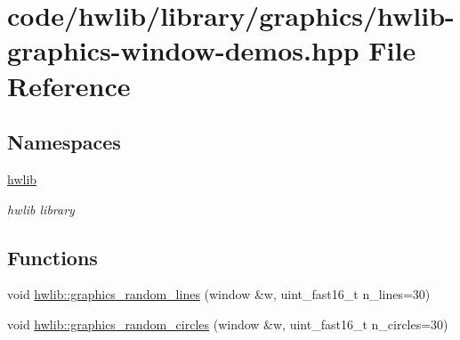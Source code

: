 \hypertarget{hwlib-graphics-window-demos_8hpp}{}\section{code/hwlib/library/graphics/hwlib-\/graphics-\/window-\/demos.hpp File Reference}
\label{hwlib-graphics-window-demos_8hpp}
\subsection*{Namespaces}
\begin{DoxyCompactItemize}
\item 
 \hyperlink{namespacehwlib}{hwlib}
\begin{DoxyCompactList}\small\item\em hwlib library \end{DoxyCompactList}\end{DoxyCompactItemize}
\subsection*{Functions}
\begin{DoxyCompactItemize}
\item 
void \hyperlink{namespacehwlib_a6565c83ceab3983476ae71596ddb49a5}{hwlib\+::graphics\+\_\+random\+\_\+lines} (window \&w, uint\+\_\+fast16\+\_\+t n\+\_\+lines=30)
\item 
void \hyperlink{namespacehwlib_a1adc4e1384730a5ea80a1db07a4b22ae}{hwlib\+::graphics\+\_\+random\+\_\+circles} (window \&w, uint\+\_\+fast16\+\_\+t n\+\_\+circles=30)
\end{DoxyCompactItemize}

